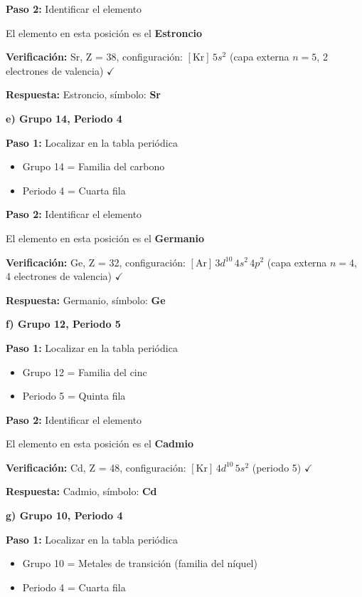 \begin{exercise}
\begin{solu}
        \textbf{Paso 2:} Identificar el elemento

        El elemento en esta posición es el \textbf{Estroncio}

        \textbf{Verificación:} Sr, Z = 38, configuración: \([\text{Kr}] \, 5s^2\) (capa externa \(n = 5\), 2 electrones de valencia) \(\checkmark\)

        \textbf{Respuesta:} Estroncio, símbolo: \textbf{Sr}

        \textbf{e) Grupo 14, Periodo 4}

        \textbf{Paso 1:} Localizar en la tabla periódica
        \begin{itemize}
            \item Grupo 14 = Familia del carbono
            \item Periodo 4 = Cuarta fila
        \end{itemize}

        \textbf{Paso 2:} Identificar el elemento

        El elemento en esta posición es el \textbf{Germanio}

        \textbf{Verificación:} Ge, Z = 32, configuración: \([\text{Ar}] \, 3d^{10} \, 4s^2 \, 4p^2\) (capa externa \(n = 4\), 4 electrones de valencia) \(\checkmark\)

        \textbf{Respuesta:} Germanio, símbolo: \textbf{Ge}

        \textbf{f) Grupo 12, Periodo 5}

        \textbf{Paso 1:} Localizar en la tabla periódica
        \begin{itemize}
            \item Grupo 12 = Familia del cinc
            \item Periodo 5 = Quinta fila
        \end{itemize}

        \textbf{Paso 2:} Identificar el elemento

        El elemento en esta posición es el \textbf{Cadmio}

        \textbf{Verificación:} Cd, Z = 48, configuración: \([\text{Kr}] \, 4d^{10} \, 5s^2\) (periodo 5) \(\checkmark\)

        \textbf{Respuesta:} Cadmio, símbolo: \textbf{Cd}

        \textbf{g) Grupo 10, Periodo 4}

        \textbf{Paso 1:} Localizar en la tabla periódica
        \begin{itemize}
            \item Grupo 10 = Metales de transición (familia del níquel)
            \item Periodo 4 = Cuarta fila
        \end{itemize}


\end{solu}
\end{exercise}
